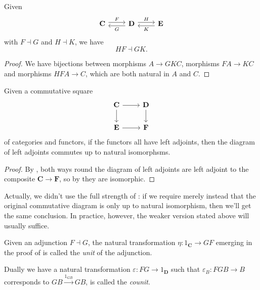 \documentclass[a4paper]{article}
\renewcommand{\c}[1]{\mathbf{#1}}
\newcommand{\adjoint}{\dashv}
\begin{document}
\begin{lemma}
  \label{lem:composition of adjoints}
  Given
  \[
    \begin{tikzcd}
      \c C \ar[r, "F", shift left] & \c D \ar[l, "G", shift left] \ar[r, "H", shift left] & \c E \ar[l, "K", shift left]
    \end{tikzcd}
  \]
  with \(F \adjoint G\) and \(H \adjoint K\), we have
  \[
    HF \adjoint GK.
  \]
\end{lemma}

\begin{proof}
  We have bijections between morphisms \(A \to GKC\), morphisms \(FA \to KC\) and morphisms \(HFA \to C\), which are both natural in \(A\) and \(C\).
\end{proof}

\begin{corollary}
  \label{cor:commutative square of adjoints}
  Given a commutative square
  \[
    \begin{tikzcd}
      \c C \ar[r] \ar[d] & \c D \ar[d] \\
      \c E \ar[r] &\c F
    \end{tikzcd}
  \]
  of categories and functors, if the functors all have left adjoints, then the diagram of left adjoints commutes up to natural isomorphsms.
\end{corollary}

\begin{proof}
  By , both ways round the diagram of left adjoints are left adjoint to the composite \(\c C \to \c F\), so by  they are isomorphic.
\end{proof}

Actually, we didn't use the full strength of : if we require merely instead that the original commutative diagram is only up to natural isomorphism, then we'll get the same conclusion. In practice, however, the weaker version stated above will usually suffice.

\begin{definition}
  Given an adjunction \(F \adjoint G\), the natural transformation \(\eta: 1_{\c C} \to GF\) emerging in the proof of  is called the \emph{unit} of the adjunction.

  Dually we have a natural transformation \(\varepsilon: FG \to 1_{\c D}\) such that \(\varepsilon_B: FGB \to B\) corresponds to \(GB \xrightarrow{1_{GB}} GB\), is called the \emph{counit}.
\end{definition}
\end{document}
